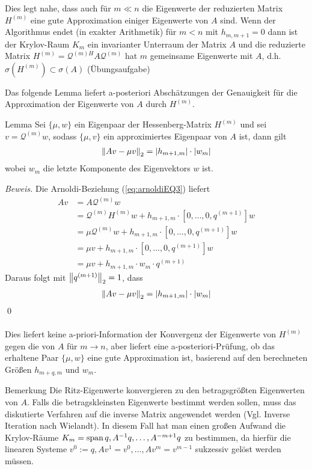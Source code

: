 Dies legt nahe, dass auch für $m\ll n$ die Eigenwerte der reduzierten Matrix $H^{(m)}$ eine gute Approximation 
einiger Eigenwerte von $A$ sind. Wenn der Algorithmus endet (in exakter Arithmetik) für $m<n$ mit $h_{m,m+1} = 0$ dann
ist der Krylov-Raum $K_m$ ein invarianter Unterraum der Matrix $A$ und die reduzierte Matrix $H^{(m)} = 
{\mathcal{Q}^{(m)H}} A \mathcal{Q}^{(m)}$ hat $m$ gemeinsame Eigenwerte mit $A$, 
d.h. $\sigma(H^{(m)})\subset \sigma(A)$ (Übungsaufgabe)

Das folgende Lemma liefert a-posteriori Abschätzungen der Genauigkeit für die Approximation der Eigenwerte von $A$ durch 
$H^{(m)}$.

\begin{colbox}{Lemma}
  Sei $\{\mu,w\}$ ein Eigenpaar der Hessenberg-Matrix $H^{(m)}$ und sei $v=\mathcal{Q}^{(m)}w$, sodass $\{\mu,v\}$ ein 
  approximiertes Eigenpaar von $A$ ist, dann gilt
  \begin{align*}
    \vertn{2}{Av-\mu v}_2 = |h_{m+1,m}|\cdot |w_m|
  \end{align*} 
  wobei $w_m$ die letzte Komponente des Eigenvektors $w$ ist.
\end{colbox}

\textit{Beweis.} Die Arnoldi-Beziehung (\ref{eq:arnoldiEQ3}) liefert
%
\begin{align*}
Av 
&= A\mathcal{Q}^{(m)}w\\ 
&= \mathcal{Q}^{(m)}H^{(m)}w + h_{m+1,m}\cdot[0,\dots,0,q^{(m+1)}]w \\
&= \mu \mathcal{Q}^{(m)}w + h_{m+1,m}\cdot[0,\dots,0,q^{(m+1)}]w \\
&= \mu v + h_{m+1,m}\cdot[0,\dots,0,q^{(m+1)}]w \\
&= \mu v + h_{m+1,m}\cdot w_m \cdot q^{(m+1)}
\end{align*}
%
Daraus folgt mit $\vertn{2}{q^{(m+1)}}_2 = 1$, dass
\begin{align*}\vertn{2}{Av-\mu v}_2 
  = |h_{m+1,m}|\cdot |w_m|
\end{align*}
\qed \\ \\
Dies liefert keine a-priori-Information der Konvergenz der Eigenwerte von $H^{(m)}$ gegen die von $A$ für $m\to n$, aber
liefert eine a-posteriori-Prüfung, ob das erhaltene Paar 
$\{\mu,w\}$ eine gute Approximation ist, basierend auf den berechneten Größen $h_{m+q,m}$ und $w_m$.

\begin{colbox}{Bemerkung}
  Die Ritz-Eigenwerte konvergieren zu den betragsgrößten Eigenwerten von $A$. Falls die betragskleinsten Eigenwerte 
  bestimmt werden sollen, muss das diskutierte Verfahren auf die inverse Matrix angewendet werden (Vgl. Inverse 
  Iteration nach Wielandt). In diesem Fall hat man einen großen Aufwand die Krylov-Räume 
  $K_m = \operatorname*{span}{q,A^{-1}q,\dots,A^{-m+1}q}$ zu bestimmen, da hierfür die linearen Systeme $v^0:=q, Av^1=v^0, 
  \dots, Av^m=v^{m-1}$ sukzessiv gelöst werden müssen.
\end{colbox}

